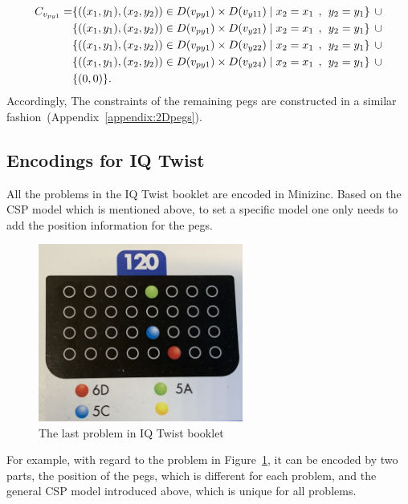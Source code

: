 \begin{equation}
\label{equ:fourthconstrain}
\begin{aligned}  
\Constraint{py1} = &\{((x_{1},y_{1}),(x_{2},y_{2}))\in \Domain{py1} \times \Domain{y11}\mid x_{2} = x_{1} \hspace{1ex} , \hspace{1ex}  y_{2} = y_{1}\}\hspace{1ex} \cup  
\\&\{((x_{1},y_{1}),(x_{2},y_{2}))\in \Domain{py1} \times \Domain{y21}\mid x_{2} = x_{1} \hspace{1ex} , \hspace{1ex}  y_{2} = y_{1}\}\hspace{1ex} \cup 
\\&\{ ((x_{1},y_{1}),(x_{2},y_{2}))\in \Domain{py1} \times \Domain{y22}\mid x_{2} = x_{1} \hspace{1ex} , \hspace{1ex}  y_{2} = y_{1}\}\hspace{1ex}\cup 
\\& \{((x_{1},y_{1}),(x_{2},y_{2}))\in \Domain{py1} \times \Domain{y24}\mid x_{2} = x_{1} \hspace{1ex} , \hspace{1ex}  y_{2} = y_{1}\} \hspace{1ex}\cup
\\& \{(0,0)\}.
\end{aligned}
\end{equation}
Accordingly, The constraints of the remaining pegs are constructed in a similar fashion~(Appendix~\ref{appendix:2Dpegs}).
\subsection{Encodings for IQ Twist}
\label{section:Encodings1}
All the problems in the IQ Twist booklet are encoded in Minizinc. Based on the CSP model which is mentioned above, to set a specific model one only needs to add the position information for the pegs. 
\begin{figure}[htbp]
    \centering
    \includegraphics[width=0.6\textwidth]{figs/implementation1.jpg}
    \caption{The last problem in IQ Twist booklet}
    \label{fig:last_case}
\end{figure}
For example, with regard to the problem in Figure~\ref{fig:last_case}, it can be encoded by two parts, the position of the pegs, which is different for each problem, and the general CSP model introduced above, which is unique for all problems.
